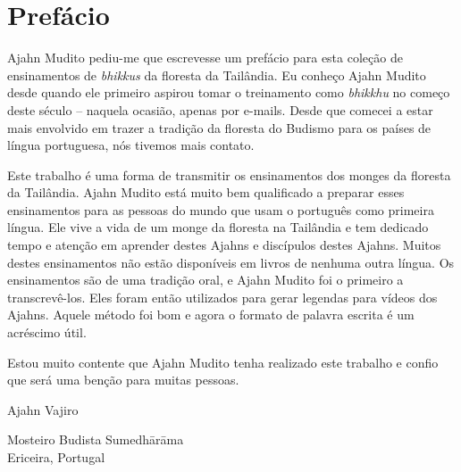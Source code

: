 
\chapter{Prefácio}

Ajahn Mudito pediu-me que escrevesse um prefácio para esta coleção
de ensinamentos de \emph{bhikkus} da floresta da Tailândia. Eu
conheço Ajahn Mudito desde quando ele primeiro aspirou tomar o
treinamento como \emph{bhikkhu} no começo deste século – naquela
ocasião, apenas por e-mails. Desde que comecei a estar mais envolvido
em trazer a tradição da floresta do Budismo para os países de língua
portuguesa, nós tivemos mais contato.

Este trabalho é uma forma de transmitir os ensinamentos dos monges
da floresta da Tailândia. Ajahn Mudito está muito bem qualificado a
preparar esses ensinamentos para as pessoas do mundo que usam o
português como primeira língua. Ele vive a vida de um monge da floresta
na Tailândia e tem dedicado tempo e atenção em aprender destes Ajahns e
discípulos destes Ajahns. Muitos destes ensinamentos não estão
disponíveis em livros de nenhuma outra língua. Os ensinamentos são de
uma tradição oral, e Ajahn Mudito foi o primeiro a transcrevê-los. Eles
foram então utilizados para gerar legendas para vídeos dos Ajahns.
Aquele método foi bom e agora o formato de palavra escrita é um
acréscimo útil.

Estou muito contente que Ajahn Mudito tenha realizado este trabalho
e confio que será uma benção para muitas pessoas.

\bigskip

{\raggedleft
Ajahn Vajiro

Mosteiro Budista Sumedhārāma\\
Ericeira, Portugal
\par}

